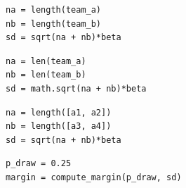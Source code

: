 \documentclass[a4paper,10pt]{book}
\theoremstyle{definition}
\newif\ifen
\newif\ifes
\newcommand{\en}[1]{\ifen#1\fi}
\newcommand{\es}[1]{\ifes#1\fi}
\begin{document}
\begin{lstlisting}[backgroundcolor=\color{white}, label=lst:draw, caption={\en{Computing the draw margin}\es{Computando el margen de empate}}, belowskip=-1.0 \baselineskip, aboveskip=-0 \baselineskip]
\end{lstlisting}
\begin{paracol}{3}
\begin{lstlisting}[backgroundcolor=\color{julia!60},belowskip=-0.77 \baselineskip]
na = length(team_a)
nb = length(team_b)
sd = sqrt(na + nb)*beta
\end{lstlisting}
\switchcolumn
\begin{lstlisting}[backgroundcolor=\color{python!60},belowskip=-0.77 \baselineskip]
na = len(team_a)
nb = len(team_b)
sd = math.sqrt(na + nb)*beta
\end{lstlisting}
\switchcolumn
\begin{lstlisting}[backgroundcolor=\color{r!50},belowskip=-0.77 \baselineskip]
na = length([a1, a2])
nb = length([a3, a4])
sd = sqrt(na + nb)*beta
\end{lstlisting}
\end{paracol}
\begin{lstlisting}[backgroundcolor=\color{all}]
p_draw = 0.25
margin = compute_margin(p_draw, sd)
\end{lstlisting}
%
\en{where the individual agents (\texttt{a1} to \texttt{a4}) were initialized in code~\ref{lst:player} and \texttt{beta} in code~\ref{lst:parameters}. }%
\es{donde los agentes \texttt{a} fueron inicializados en el c\'odigo \ref{lst:player}, y \texttt{beta} en el c\'odigo~\ref{lst:parameters}. }%
\end{document}
